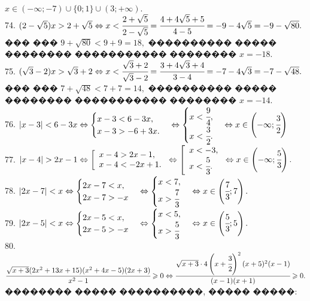 \documentclass[12pt]{article}
\begin{document}
$x\in(-\infty;-7)\cup\{0;1\}\cup(3;+\infty).$\\
74. $(2-\sqrt{5})x>2+\sqrt{5}\Leftrightarrow x<\cfrac{2+\sqrt{5}}{2-\sqrt{5}}=\cfrac{4+4\sqrt{5}+5}{4-5}=-9-4\sqrt{5}=-9-\sqrt{80}.$ ��� ��� $9+\sqrt{80}<9+9=18,$
���������� ����� �������� ����������� �������� $x=-18.$\\
75. $(\sqrt{3}-2)x>\sqrt{3}+2\Leftrightarrow x<\cfrac{\sqrt{3}+2}{\sqrt{3}-2}=\cfrac{3+4\sqrt{3}+4}{3-4}=-7-4\sqrt{3}=-7-\sqrt{48}.$ ��� ��� $7+\sqrt{48}<7+7=14,$
���������� ����� �������� ����������� �������� $x=-14.$\\
76. $|x-3|<6-3x\Leftrightarrow\begin{cases} x-3<6-3x,\\x-3>-6+3x.\end{cases}
\Leftrightarrow\begin{cases} x<\cfrac{9}{4},\\ x<\cfrac{3}{2}.\end{cases}\Leftrightarrow x\in\left(-\infty;\cfrac{3}{2}\right)$\\
77. $|x-4|>2x-1\Leftrightarrow\left[\begin{array}{l}x-4>2x-1,\\x-4<-2x+1.\end{array}\right.
\Leftrightarrow\left[\begin{array}{l}x<-3,\\x<\cfrac{5}{3}.\end{array}\right.\Leftrightarrow x\in\left(-\infty;\cfrac{5}{3}\right).$\\
78. $|2x-7|<x \Leftrightarrow \begin{cases} 2x-7<x,\\ 2x-7> -x\end{cases} \Leftrightarrow \begin{cases} x<7,\\ x>\cfrac{7}{3}\end{cases}
\Leftrightarrow x\in\left(\cfrac{7}{3};7\right).$\\
79. $|2x-5|<x \Leftrightarrow \begin{cases} 2x-5<x,\\ 2x-5> -x\end{cases} \Leftrightarrow \begin{cases} x<5,\\ x>\cfrac{5}{3}\end{cases}
\Leftrightarrow x\in\left(\cfrac{5}{3};5\right).$\\
80. $\cfrac{\sqrt{x+3}(2x^2+13x+15)(x^2+4x-5)(2x+3)}{x^2-1}\geqslant0 \Leftrightarrow \cfrac{\sqrt{x+3}\cdot4\left(x+\cfrac{3}{2}\right)^2(x+5)^2(x-1)}{(x-1)(x+1)}\geqslant0.$ �������� ����� ����������, ����� �����:
\end{document}
